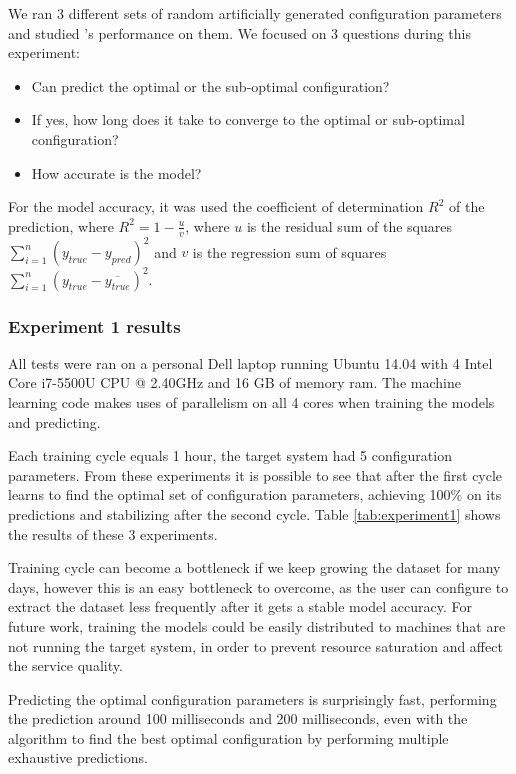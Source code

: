 We ran 3 different sets of random artificially generated configuration parameters and studied \projectname{}'s performance on them. We focused on 3 questions during this experiment:

\begin{itemize}
  \item Can \projectname{} predict the optimal or the sub-optimal configuration?
  \item If yes, how long does it take to converge to the optimal or sub-optimal configuration?
  \item How accurate is the model?
\end{itemize}

For the model accuracy, it was used the coefficient of determination $R^2$ of the prediction, where $R^2 = 1 - \frac{u}{v}$, where $u$ is the residual sum of the squares  $\sum_{i=1}^{n}(y_{true} - y_{pred})^2$ and $v$ is the regression sum of squares $\sum_{i=1}^{n}(y_{true} - \overline{y_{true}})^2$.

\subsubsection{Experiment 1 results}

All tests were ran on a personal Dell laptop running Ubuntu 14.04 with 4 Intel Core i7-5500U CPU @ 2.40GHz and 16 GB of memory ram. The machine learning code makes uses of parallelism on all 4 cores when training the models and predicting.

Each training cycle equals 1 hour, the target system had 5 configuration parameters. From these experiments it is possible to see that after the first cycle \projectname{} learns to find the optimal set of configuration parameters, achieving 100\% on its predictions and stabilizing after the second cycle. Table \ref{tab:experiment1} shows the results of these 3 experiments.

Training cycle can become a bottleneck if we keep growing the dataset for many days, however this is an easy bottleneck to overcome, as the user can configure \projectname{} to extract the dataset less frequently after it gets a stable model accuracy. For future work, training the models could be easily distributed to machines that are not running the target system, in order to prevent resource saturation and affect the service quality.

Predicting the optimal configuration parameters is surprisingly fast, performing the prediction around 100 milliseconds and 200 milliseconds, even with the algorithm to find the best optimal configuration by performing multiple exhaustive predictions.

